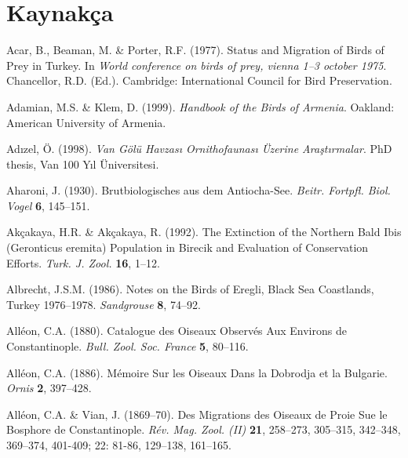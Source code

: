\documentclass[
  a4paper,
  DIV=11,
  numbers=noendperiod]{scrreprt}
\newlength{\cslhangindent}
\newenvironment{CSLReferences}[2] %
 {\begin{list}{}{%
  \setlength{\itemindent}{0pt}
  \setlength{\leftmargin}{0pt}
  \setlength{\parsep}{0pt}
  \ifodd #1
   \setlength{\leftmargin}{\cslhangindent}
   \setlength{\itemindent}{-1\cslhangindent}
  \fi
  \setlength{\itemsep}{#2\baselineskip}}}
 {\end{list}}
\begin{document}

\chapter*{Kaynakça}\label{kaynakuxe7a}


\label{refs}
\begin{CSLReferences}{1}{1}
Acar, B., Beaman, M. \& Porter, R.F. (1977). {Status and Migration of
Birds of Prey in Turkey}. In \emph{World conference on birds of prey,
vienna 1--3 october 1975}. Chancellor, R.D. (Ed.). Cambridge:
International Council for Bird Preservation.

Adamian, M.S. \& Klem, D. (1999). \emph{{Handbook of the Birds of
Armenia}}. Oakland: American University of Armenia.

Adızel, Ö. (1998). \emph{{Van Gölü Havzası Ornithofaunası Üzerine
Araştırmalar}}. PhD thesis, Van 100 Yıl Üniversitesi.

Aharoni, J. (1930). {Brutbiologisches aus dem Antiocha-See}.
\emph{Beitr. Fortpfl. Biol. Vogel} \textbf{6}, 145--151.

Akçakaya, H.R. \& Akçakaya, R. (1992). {The Extinction of the Northern
Bald Ibis ({Geronticus eremita}) Population in Birecik and Evaluation of
Conservation Efforts}. \emph{Turk. J. Zool.} \textbf{16}, 1--12.

Albrecht, J.S.M. (1986). {Notes on the Birds of Eregli, Black Sea
Coastlands, Turkey 1976--1978}. \emph{Sandgrouse} \textbf{8}, 74--92.

Alléon, C.A. (1880). {Catalogue des Oiseaux Observés Aux Environs de
Constantinople}. \emph{Bull. Zool. Soc. France} \textbf{5}, 80--116.

Alléon, C.A. (1886). {Mémoire Sur les Oiseaux Dans la Dobrodja et la
Bulgarie}. \emph{Ornis} \textbf{2}, 397--428.

Alléon, C.A. \& Vian, J. (1869--70). {Des Migrations des Oiseaux de
Proie Sue le Bosphore de Constantinople}. \emph{Rév. Mag. Zool. (II)}
\textbf{21}, 258--273, 305--315, 342--348, 369--374, 401-409; 22: 81-86,
129--138, 161--165.


\end{CSLReferences}
\end{document}
